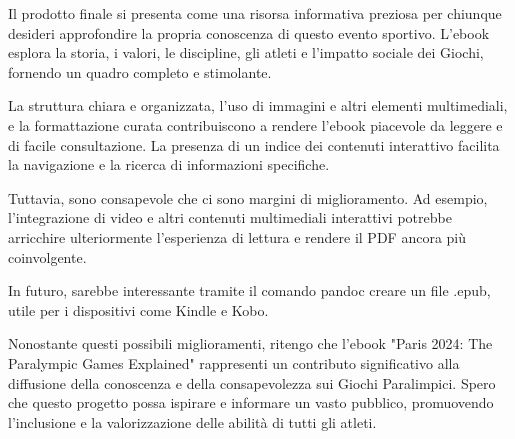 \documentclass[a4paper,12pt]{report}
\begin{document}
Il prodotto finale si presenta come una risorsa informativa preziosa per chiunque desideri approfondire la propria conoscenza di questo evento sportivo. L'ebook esplora la storia, i valori, le discipline, gli atleti e l'impatto sociale dei Giochi, fornendo un quadro completo e stimolante.

La struttura chiara e organizzata, l'uso di immagini e altri elementi multimediali, e la formattazione curata contribuiscono a rendere l'ebook piacevole da leggere e di facile consultazione. La presenza di un indice dei contenuti interattivo facilita la navigazione e la ricerca di informazioni specifiche.

Tuttavia, sono consapevole che ci sono margini di miglioramento. Ad esempio, l'integrazione di video e altri contenuti multimediali interattivi potrebbe arricchire ulteriormente l'esperienza di lettura e rendere il PDF ancora più coinvolgente.

In futuro, sarebbe interessante tramite il comando pandoc creare un file .epub, utile per i dispositivi come Kindle e Kobo.

Nonostante questi possibili miglioramenti, ritengo che l'ebook "Paris 2024: The Paralympic Games Explained" rappresenti un contributo significativo alla diffusione della conoscenza e della consapevolezza sui Giochi Paralimpici. Spero che questo progetto possa ispirare e informare un vasto pubblico, promuovendo l'inclusione e la valorizzazione delle abilità di tutti gli atleti.
								
\end{document}
